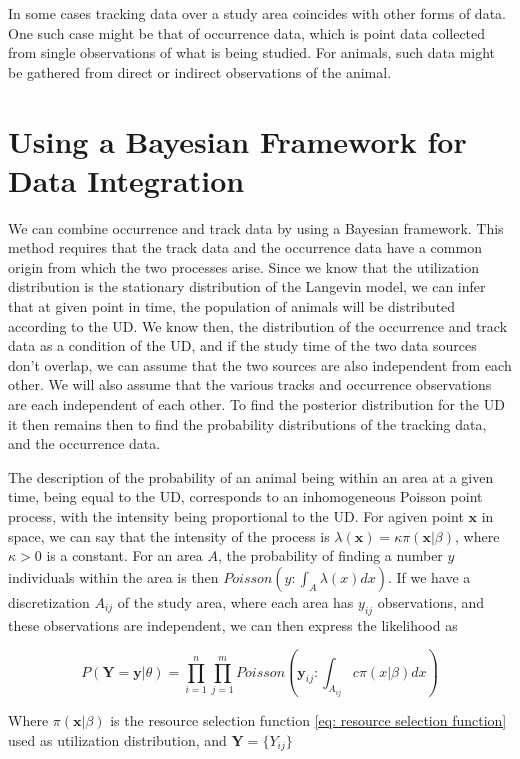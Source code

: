 In some cases tracking data over a study area coincides with other forms of data. One such case might be that of occurrence data, which is point data collected from single observations of what is being studied. For animals, such data might be gathered from direct or indirect observations of the animal.

\section{Using a Bayesian Framework for Data Integration}
We can combine occurrence and track data by using a Bayesian framework. This method requires that the track data and the occurrence data have a common origin from which the two processes arise. Since we know that the utilization distribution is the stationary distribution of the Langevin model, we can infer that at given point in time, the population of animals will be distributed according to the UD. We know then, the distribution of the occurrence and track data as a condition of the UD, and if the study time of the two data sources don't overlap, we can assume that the two sources are also independent from each other. We will also assume that the various tracks and occurrence observations are each independent of each other. To find the posterior distribution for the UD it then remains then to find the probability distributions of the tracking data, and the occurrence data. 

The description of the probability of an animal being within an area at a given time, being equal to the UD, corresponds to an inhomogeneous Poisson point process, with the intensity being proportional to the UD. For agiven point $\textbf{x}$ in space, we can say that the intensity of the process is $\lambda(\textbf{x}) = \kappa \pi(\textbf{x}|\beta)$, where $\kappa>0$ is a constant. For an area $A$, the probability of finding a number $y$ individuals within the area is then $Poisson(y:\int_A \lambda(x)dx)$. If we have a discretization $A_{ij}$ of the study area, where each area has $y_{ij}$ observations, and these observations are independent, we can then express the likelihood as 


\begin{equation}
    P(\textbf{Y} = \textbf{y}|\theta) = \prod_{i=1}^n \prod_{j=1}^m Poisson(\textbf{y}_{ij}: \int_{A_{ij}} c\pi(x|\beta)dx)
\end{equation}

Where $ \pi(\textbf{x}|\beta) $ is the resource selection function \ref{eq: resource selection function} used as utilization distribution, and $\textbf{Y} = \{Y_{ij}\}$ 

